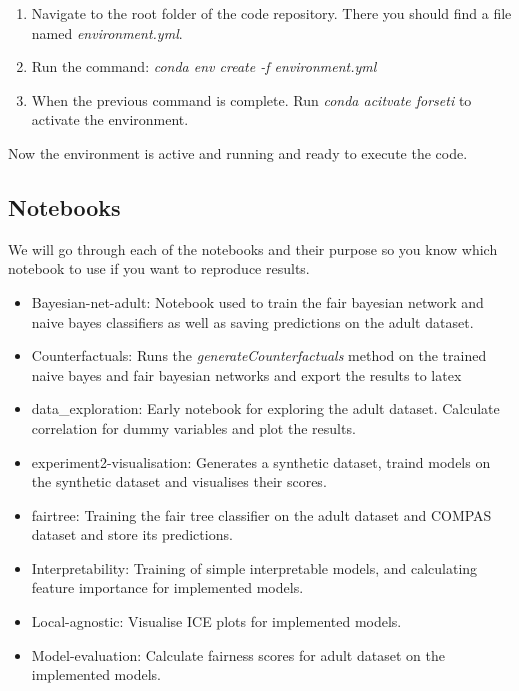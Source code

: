 \begin{enumerate}
    \item Navigate to the root folder of the code repository. There you should find a file named \emph{environment.yml}.
    \item Run the command: \emph{conda env create -f environment.yml}
    \item When the previous command is complete. Run \emph{conda acitvate forseti} to activate the environment.
\end{enumerate}

Now the environment is active and running and ready to execute the code.

\subsection{Notebooks}

We will go through each of the notebooks and their purpose so you know which notebook to use if you want to reproduce results.

\begin{itemize}
    \item Bayesian-net-adult: Notebook used to train the fair bayesian network and naive bayes classifiers as well as saving predictions on the adult dataset.
    \item Counterfactuals: Runs the \emph{generateCounterfactuals} method on the trained naive bayes and fair bayesian networks and export the results to latex
    \item data\_exploration: Early notebook for exploring the adult dataset. Calculate correlation for dummy variables and plot the results.
    \item experiment2-visualisation: Generates a synthetic dataset, traind models on the synthetic dataset and visualises their scores.
    \item fairtree: Training the fair tree classifier on the adult dataset and COMPAS dataset and store its predictions.
    \item Interpretability: Training of simple interpretable models, and calculating feature importance for implemented models.
    \item Local-agnostic: Visualise ICE plots for implemented models.
    \item Model-evaluation: Calculate fairness scores for adult dataset on the implemented models.
\end{itemize} 